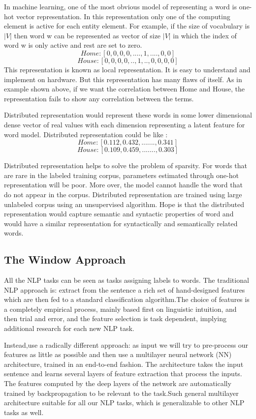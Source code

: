 \documentclass[12pt,a4paper,final]{extreport}
\begin{document}
\vspace{0.5cm}
In machine learning, one of the most obvious model of representing a word is one-hot vector representation. In this representation only one of the computing element is active for each entity element. For
example, if the size of vocabulary is $|V|$ then word w can be represented as vector of size $|V|$ in which the index of word w is only active and rest are set to zero.
\[ Home : [0,0,0,0,....,1,....,0,0] \]
\[ House: [0,0,0,0,..,1,..,0,0,0,0] \]
This representation is known as local representation. It is easy to understand and implement on hardware. But this representation has many 
flaws of itself. As in example shown above, if we want the correlation between Home and House, the representation fails to show any correlation between the terms.

\vspace{0.5cm}
Distributed representation would represent these words in some lower dimensional dense vector of real values with each dimension representing a latent feature for word model. Distributed representation could be like :
\[ Home : [0.112,0.432,.......,0.341] \]
\[ House: [0.109,0.459,.......,0.303] \]

Distributed representation helps to solve the problem of sparsity. For words that are rare in the labeled
training corpus, parameters estimated through one-hot representation will be poor. More over, the model
cannot handle the word that do not appear in the corpus. Distributed representation are trained using large unlabeled corpus using an unsupervised algorithm. Hope is that the distributed representation would capture semantic and syntactic properties of word and would have a similar representation for syntactically and semantically related words.

\subsection{The Window Approach}
All the NLP tasks can be seen as tasks assigning labels to words. The traditional NLP approach is: extract from the sentence a rich set of hand-designed features which are then fed to a standard classification algorithm.The choice of features is a completely empirical process, mainly based first on linguistic intuition, and then trial and error, and the feature selection is task dependent, implying additional research for each new NLP task.

\vspace{0.5cm}
Instead,use a radically different approach: as input we will try to pre-process our features as little as possible and then use a multilayer neural network (NN) architecture, trained in
an end-to-end fashion. The architecture takes the input sentence and learns several layers of feature extraction that process the inputs. The features computed by the deep layers of the network are
automatically trained by backpropagation to be relevant to the task.Such
general multilayer architecture suitable for all our NLP tasks, which is generalizable to other NLP tasks as well.
\end{document}
